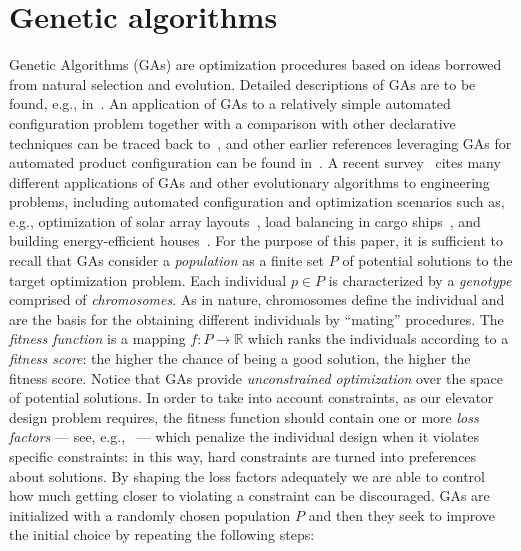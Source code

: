\section{Genetic algorithms}
\label{sec:gas}

Genetic Algorithms (GAs) are optimization procedures based on ideas 
borrowed from natural selection and evolution. Detailed descriptions
of GAs are to be found, e.g., in~\cite{davis1991handbook}. An
application of GAs to a relatively simple automated configuration
problem together with a comparison with other declarative techniques
can be traced back to~\cite{falkner2011modeling}, and
other earlier references leveraging GAs for automated product
configuration can be found in~\cite{zhang2014product}. A recent
survey~\cite{DBLP:journals/nca/SlowikK20} cites many different
applications of GAs and other evolutionary algorithms to engineering
problems, including automated configuration and optimization scenarios
such as, e.g., optimization of solar array layouts~\cite{lv2017solar}, load 
balancing in cargo ships~\cite{ramos2018new}, and building
energy-efficient houses~\cite{ascione2016simulation}.  
For the purpose of this paper, it is sufficient to recall that GAs
consider a \emph{population} as a finite set $P$ of potential
solutions to the target optimization problem. Each individual $p \in
P$ is characterized by a \emph{genotype} comprised of
\emph{chromosomes}. As in nature, chromosomes define the individual
and are the basis for the obtaining different individuals by
``mating'' procedures. The \emph{fitness function} is a mapping $f : P \to
\mathbb{R}$ which  ranks the individuals according to a \emph{fitness
  score}: the higher the chance of being a good solution, the higher the
fitness  score. Notice that GAs provide \emph{unconstrained
  optimization} over the space of potential solutions. 
In order to take into account constraints, as our elevator design problem 
requires, the fitness function should contain one or more \emph{loss 
	factors} --- see, e.g.,~\cite{homaifar1994constrained, 
	yeniay2005penalty, gungor2022meta} --- which 
penalize the individual design when it violates specific constraints: 
in this way, hard constraints are turned into preferences about 
solutions. By shaping the loss factors adequately we are able to control 
how much getting closer to violating a constraint can be discouraged.  
GAs are initialized with a randomly chosen population $P$ and then
they seek to improve the initial choice by repeating the
following steps: 
